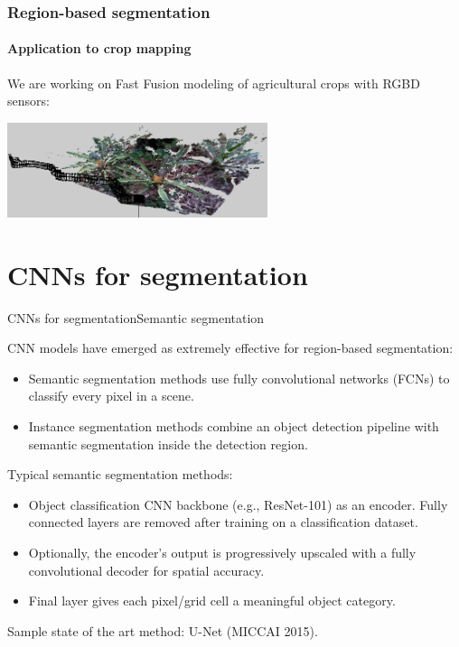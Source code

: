\documentclass[aspectratio=169]{beamer}
\begin{document}
\begin{frame}
\frametitle{Region-based segmentation}
\framesubtitle{Application to crop mapping}

We are working on Fast Fusion modeling of agricultural crops with
RGBD sensors:

\medskip

\begin{center}
\includegraphics[width=3in]{figs/gl-world}
\end{center}

\medskip

\end{frame}


\section{CNNs for segmentation}

\begin{frame}{CNNs for segmentation}{Semantic segmentation}

  CNN models have emerged as extremely effective for region-based
  segmentation:
  \begin{itemize}
  \item \alert{Semantic segmentation} methods use fully convolutional
    networks (FCNs) to classify \alert{every pixel} in a scene.
  \item \alert{Instance segmentation} methods combine an \alert{object
    detection} pipeline with semantic segmentation inside the
    detection region.
  \end{itemize}

  \medskip
  
  Typical semantic segmentation methods:
  \begin{itemize}
  \item Object classification CNN backbone (e.g., ResNet-101) as an encoder.
    Fully connected layers are removed after training on a classification
    dataset.
  \item Optionally, the encoder's output is progressively upscaled
    with a fully convolutional decoder for spatial accuracy.
  \item Final layer gives each pixel/grid cell a meaningful object category.
  \end{itemize}

  \medskip

  Sample state of the art method: U-Net (MICCAI 2015).

\end{frame}
\end{document}
